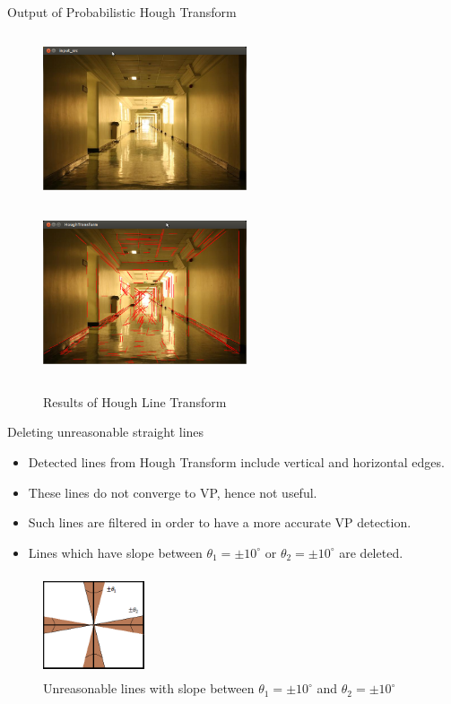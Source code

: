\documentclass[8pt]{beamer}
\begin{document}
\begin{frame}{Output of Probabilistic Hough Transform}
 \begin{figure}
\includegraphics[width=6cm, height=5cm]{images/inputimage.png}%
\includegraphics[width=6cm, height=5cm]{images/Hough_Lines.png}%
\caption{Results of Hough Line Transform}%
\end{figure}
\end{frame}


\begin{frame}{Deleting unreasonable straight lines}
 \begin{itemize}
  \setlength\itemsep{1em}
  \item Detected lines from Hough Transform include vertical and horizontal edges. 
  \item These lines do not converge to VP, hence not useful. 
  \item Such lines are filtered in order to have a more accurate VP detection. 
  \item Lines which have slope between $\theta_1 = \pm10^{\circ}$ or $\theta_2 = \pm10^{\circ}$ are deleted.
 \end{itemize}
 \begin{figure}
 \centering
\includegraphics[width=3cm, height=3cm]{images/deleted.png}%
\caption{Unreasonable lines with slope between $\theta_1 = \pm10^{\circ}$ and $\theta_2 = \pm10^{\circ}$}%
\label{fig:unreasonablelines}
\end{figure}

\end{frame}
\end{document}
